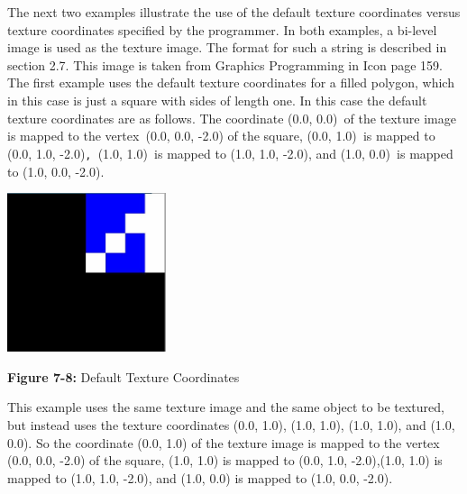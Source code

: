 The next two examples illustrate the use of the default texture
coordinates versus texture coordinates specified by the programmer. In
both examples, a bi-level image is used as the texture image. The
format for such a string is described in section 2.7. This image is
taken from Graphics Programming in Icon page 159. The first example
uses the default texture coordinates for a filled polygon, which in
this case is just a square with sides of length one. In this case the
default texture coordinates are as follows. The coordinate (0.0,
0.0)\texttt{ }of the texture image is mapped to the vertex\texttt{
}(0.0, 0.0, -2.0) of the square, (0.0, 1.0)\texttt{ }is mapped to (0.0,
1.0, -2.0)\texttt{, }(1.0, 1.0)\texttt{ }is mapped to (1.0, 1.0, -2.0),
and (1.0, 0.0)\texttt{ }is mapped to (1.0, 0.0, -2.0).

{\centering 
\includegraphics[width=1.8335in,height=1.8335in]{ub-img/ub-img39.jpg}
\par}

{\sffamily\bfseries Figure 7-8:}
{\sffamily Default Texture Coordinates}

\bigskip


This example uses the same texture image and the same object to be
textured, but instead uses the texture coordinates (0.0, 1.0), (1.0,
1.0), (1.0, 1.0), and (1.0, 0.0). So the coordinate (0.0, 1.0) of the
texture image is mapped to the vertex (0.0, 0.0, -2.0) of the square,
(1.0, 1.0) is mapped to (0.0, 1.0, -2.0),(1.0, 1.0) is mapped to (1.0,
1.0, -2.0), and (1.0, 0.0) is mapped to (1.0, 0.0, -2.0).


